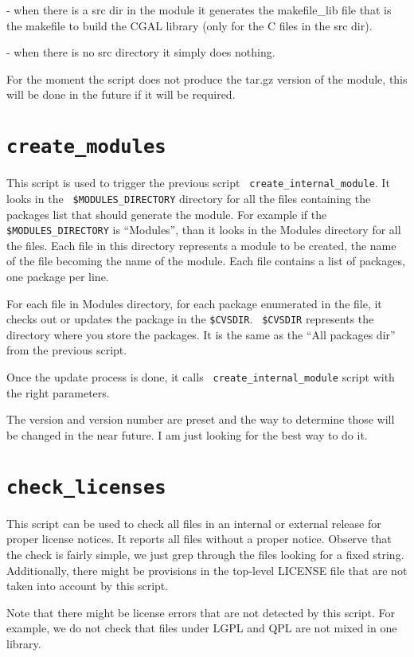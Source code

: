 - when there is a src dir in the module it generates the makefile\_lib
file that is the makefile to build the CGAL library (only for the C
files in the src dir).

  - when there is no src directory it simply does nothing.
  
  For the moment the script does not produce the tar.gz version of the
  module, this will be done in the future if it will be required.
  


\section{{\tt create\_modules}}
\label{sec:create_modules}

This script is used to trigger the previous script {\tt
  create\_internal\_module}. It looks in the {\tt
  \$MODULES\_DIRECTORY} directory for all the files containing the
packages list that should generate the module. For example if the {\tt
  \$MODULES\_DIRECTORY} is ``Modules'', than it looks in the Modules
directory for all the files. Each file in this directory represents a
module to be created, the name of the file becoming the name of the
module. Each file contains a list of packages, one package per line.

For each file in Modules directory, for each package enumerated in the
file, it checks out or updates the package in the {\tt \$CVSDIR}. {\tt
  \$CVSDIR} represents the directory where you store the packages. It
is the same as the ``All packages dir'' from the previous script.

Once the update process is done, it calls {\tt
  create\_internal\_module} script with the right parameters.

The version and version number are preset and the way to determine
those will be changed in the near future. I am just looking for the
best way to do it.
  


\section{{\tt check\_licenses}}
\label{sec:check_licenses}

This script can be used to check all files in an internal or external release
for proper license notices. It reports all files without a proper notice.
Observe that the check is fairly simple, we just grep through the files
looking for a fixed string. Additionally, there might be provisions in the
top-level LICENSE file that are not taken into account by this script.

Note that there might be license errors that are not detected by this script.
For example, we do not check that files under LGPL and QPL are not mixed in
one library.

